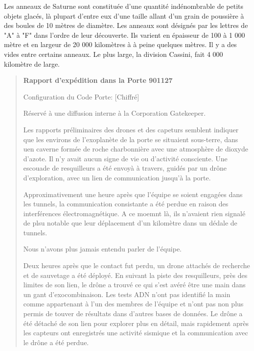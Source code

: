                                                                   Les anneaux de Saturne sont constituée d'une quantité indénombrable de petits objets glacés, là plupart d'entre eux d'une taille allant d'un grain de poussière à des boules de 10 mètres de diamètre. Les anneaux sont désignés par les lettres de "A" à "F" dans l'ordre de leur découverte. Ils varient en épaisseur de 100 à 1 000 mètre et en largeur de 20 000 kilomètres à à peine quelques mètres. Il y a des vides entre certains anneaux. Le plus large, la division Cassini, fait 4 000 kilomètre de large. 





                                                                  \begin{quotation} \textbf{Rapport d'expédition dans la Porte 901127} 

                                                                     Configuration du Code Porte: [Chiffré] 

                                                                     Réservé à une diffusion interne à la Corporation Gatekeeper. 

                                                                     Les rapports préliminaires des drones et des capeturs semblent indiquer que les environs de l'exoplanète de la porte se situaient sous-terre, dans uen caverne formée de roche charbonnière avec une atmosphère de dioxyde d'azote. Il n'y avait aucun signe de vie ou d'activité consciente. Une escouade de resquilleurs a été envoyà à travers, guidés par un drône d'exploration, avec un lien de communication jusqu'à la porte. 

                                                                     Approximativement une heure après que l'équipe se soient engagées dans les tunnels, la communication consistante a été perdue en raison des interférences électromagnétique. A ce moemnt là, ils n'avaient rien signalé de plsu notable que leur déplacement d'un kilomètre dans un dédale de tunnels. 

                                                                     Nous n'avons plus jamais entendu parler de l'équipe. 

                                                                     Deux heures après que le contact fut perdu, un drone attachés de recherche et de sauvetage a été déployé. En suivant la piste des resquilleurs, près des limites de son lien, le drône a trouvé ce qui s'est avéré être une main dans un gant d'exocombinaison. Les tests ADN n'ont pas identifié la main comme appartenant à l'un des membres de l'équipe et n'ont pas non plus permis de touver de résultats dans d'autres bases de données. Le drône a été détaché de son lien pour explorer plus en détail, mais rapidement après les capteurs ont enregistrés une activité sismique et la communication avec le drône a été perdue. 


\end{quotation}

